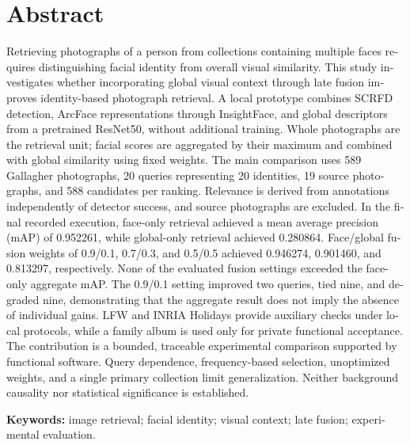 \chapter*{Abstract}
\begin{otherlanguage}{english}\begin{singlespace}
Retrieving photographs of a person from collections containing multiple faces requires distinguishing facial identity from overall visual similarity. This study investigates whether incorporating global visual context through late fusion improves identity-based photograph retrieval. A local prototype combines SCRFD detection, ArcFace representations through InsightFace, and global descriptors from a pretrained ResNet50, without additional training. Whole photographs are the retrieval unit; facial scores are aggregated by their maximum and combined with global similarity using fixed weights. The main comparison uses 589 Gallagher photographs, 20 queries representing 20 identities, 19 source photographs, and 588 candidates per ranking. Relevance is derived from annotations independently of detector success, and source photographs are excluded. In the final recorded execution, face-only retrieval achieved a mean average precision (mAP) of 0.952261, while global-only retrieval achieved 0.280864. Face/global fusion weights of 0.9/0.1, 0.7/0.3, and 0.5/0.5 achieved 0.946274, 0.901460, and 0.813297, respectively. None of the evaluated fusion settings exceeded the face-only aggregate mAP. The 0.9/0.1 setting improved two queries, tied nine, and degraded nine, demonstrating that the aggregate result does not imply the absence of individual gains. LFW and INRIA Holidays provide auxiliary checks under local protocols, while a family album is used only for private functional acceptance. The contribution is a bounded, traceable experimental comparison supported by functional software. Query dependence, frequency-based selection, unoptimized weights, and a single primary collection limit generalization. Neither background causality nor statistical significance is established.
\par\medskip\noindent\textbf{Keywords:} image retrieval; facial identity; visual context; late fusion; experimental evaluation.
\end{singlespace}\end{otherlanguage}
\clearpage
\listoffigures
\clearpage
\listoftables
\clearpage
